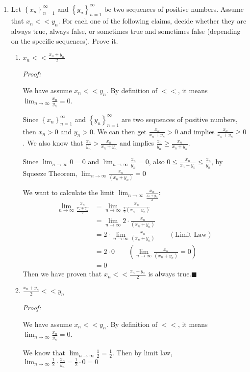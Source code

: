 \documentclass[12pt]{exam}
\newcommand {\DS} [1] {${\displaystyle #1}$}
\newcommand{\vv}{\vspace{.1cm}}
\begin{document}
\begin{enumerate}
\vv

\item Let \DS{\left\{x_n\right\}_{n=1}^{\infty}} and \DS{\left\{y_n\right\}_{n=1}^{\infty}} be two sequences of positive numbers.  Assume that \DS{x_n << y_n}. 
	For each one of the following claims, decide whether they are always true, always false, or sometimes true and sometimes false (depending on the specific sequences).  Prove it.
	\begin{enumerate}
		\item \DS{x_n << \frac{x_n+y_n}{2}}
		
		\emph{Proof:}
		
		We have assume $x_n << y_n$. By definition of $<<$, it means $\lim_{n\to\infty}\frac{x_n}{y_n}=0$.
		
		Since \DS{\left\{x_n\right\}_{n=1}^{\infty}} and \DS{\left\{y_n\right\}_{n=1}^{\infty}} are two sequences of positive numbers, then $x_n>0$ and $y_n>0$. We can then get $\frac{x_n}{x_n+y_n}>0$ and implies $\frac{x_n}{x_n+y_n}\geq0$. We also know that $\frac{x_n}{y_n}>\frac{x_n}{x_n+y_n}$ and implies $\frac{x_n}{y_n}\geq\frac{x_n}{x_n+y_n}$.
		
		Since $\lim_{n\to\infty}0=0$ and $\lim_{n\to\infty}\frac{x_n}{y_n}=0$, also $0\leq\frac{x_n}{x_n+y_n}\leq\frac{x_n}{y_n}$, by Squeeze Theorem, $\lim_{n\to\infty}\frac{x_n}{(x_n+y_n)}=0$
		
		We want to calculate the limit $\lim_{n\to\infty}\frac{x_n}{\frac{x_n+y_n}{2}}$:
		\begin{align*}
		    \lim_{n\to\infty}\frac{x_n}{\frac{x_n+y_n}{2}}&=\lim_{n\to\infty}\frac{x_n}{\frac{1}{2}(x_n+y_n)}\\
		    &=\lim_{n\to\infty}2\cdot\frac{x_n}{(x_n+y_n)}\\
		    &=2\cdot\lim_{n\to\infty}\frac{x_n}{(x_n+y_n)}\qquad(\mbox{Limit Law})\\
		    &=2\cdot0\qquad(\lim_{n\to\infty}\frac{x_n}{(x_n+y_n)}=0)\\
		    &=0
		\end{align*}
		Then we have proven that \DS{x_n << \frac{x_n+y_n}{2}} is always true.\qquad$\blacksquare$
		\newpage
		
		\item \DS{\frac{x_n+y_n}{2} << y_n}
		
		\emph{Proof:}
		
		We have assume $x_n << y_n$. By definition of $<<$, it means $\lim_{n\to\infty}\frac{x_n}{y_n}=0$.
		
		We know that $\lim_{n\to\infty}\frac{1}{2}=\frac{1}{2}$. Then by limit law, $\lim_{n\to\infty}\frac{1}{2}\cdot\frac{x_n}{y_n}=\frac{1}{2}\cdot0=0$
		

\end{enumerate}
\end{enumerate}
\end{document}

